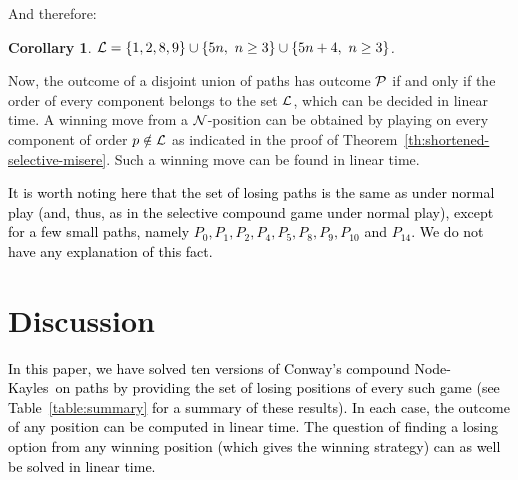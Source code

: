 \documentclass[11pt]{article}
\newcommand{\modif}[1]{\textcolor{black}{#1}}
\newcommand{\NK}{Node-Kayles}
\newcommand{\NN}{{\cal N}}
\newcommand{\PP}{{\cal P}}
\newcommand{\LL}{{\cal L}}
\newtheorem{corollary}[theorem]{Corollary}
\begin{document}
And therefore:

\begin{corollary}
$\LL=\{1,2,8,9\}\cup\{5n,\ n\ge 3\}\cup\{5n+4,\ n\ge 3\}$.
\end {corollary}

Now, the outcome of a disjoint union of paths has outcome $\PP$
if and only if the order of every component belongs to the set $\LL$,
which can be decided in linear time.
A winning move from a $\NN$-position can be obtained by playing
on every component of order $p\notin\LL$ as indicated in the
proof of Theorem~\ref{th:shortened-selective-misere}.
Such a winning move
can be found in linear time.

\modif{It is worth noting here that the set of losing
paths is the same as under normal play (and, thus, as in
the selective compound game under normal play), except for a few
small paths, namely $P_0, P_1, P_2, P_4, P_5, P_8, P_9, P_{10}$
and $P_{14}$. We do not have any explanation of this fact.}

\section{Discussion}
\label{sec:discussion}

\modif{
In this paper, we have solved ten versions of Conway's compound
\NK\ on paths by providing the set of losing positions of every
such game (see Table~\ref{table:summary} for a summary of these results). 
In each case, the outcome of any position can be
computed in linear time. The question of finding a
losing option from any winning position (which gives the winning
strategy) can as well be solved
in linear time. 
}
\end{document}
